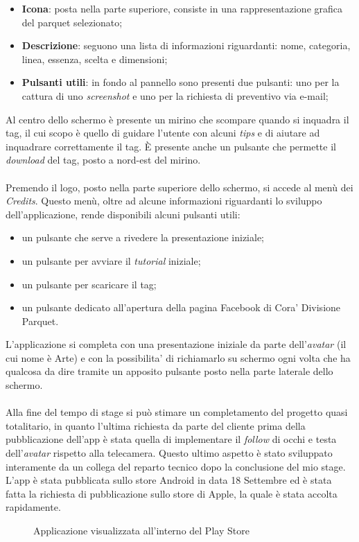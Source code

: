 \begin{itemize}
	\item \textbf{Icona}: posta nella parte superiore, consiste in una rappresentazione grafica del parquet selezionato;
	\item \textbf{Descrizione}: seguono una lista di informazioni riguardanti: nome, categoria, linea, essenza, scelta e dimensioni;
	\item \textbf{Pulsanti utili}: in fondo al pannello sono presenti due pulsanti: uno per la cattura di uno \textit{screenshot} e uno per la richiesta di preventivo via e-mail;
\end{itemize}
\noindent
Al centro dello schermo \`e presente un mirino che scompare quando si inquadra il tag, il cui scopo \`e quello di guidare l'utente con alcuni \textit{tips} e di aiutare ad inquadrare correttamente il tag. \`E presente anche un pulsante che permette il \textit{download} del tag, posto a nord-est del mirino.\\\\
\noindent
Premendo il logo, posto nella parte superiore dello schermo, si accede al men\`u dei \textit{Credits}. Questo men\`u, oltre ad alcune informazioni riguardanti lo sviluppo dell'applicazione, rende disponibili alcuni pulsanti utili:

\begin{itemize}
	\item un pulsante che serve a rivedere la presentazione iniziale;
	\item un pulsante per avviare il \textit{tutorial} iniziale;
	\item un pulsante per scaricare il tag;
	\item un pulsante dedicato all'apertura della pagina Facebook di Cora' Divisione Parquet.
\end{itemize}
\noindent
L'applicazione si completa con una presentazione iniziale da parte dell'\textit{avatar\gloss} (il cui nome \`e Arte) e con la possibilita' di richiamarlo su schermo ogni volta che ha qualcosa da dire tramite un apposito pulsante posto nella parte laterale dello schermo.\\\\

\noindent
Alla fine del tempo di stage si pu\`o stimare un completamento del progetto quasi totalitario, in quanto l'ultima richiesta da parte del cliente prima della pubblicazione dell'app \`e stata quella di implementare il \textit{follow} di occhi e testa dell'\textit{avatar\gloss} rispetto alla telecamera. Questo ultimo aspetto \`e stato sviluppato interamente da un collega del reparto tecnico dopo la conclusione del mio stage.\\
L'app \`e stata pubblicata sullo store Android in data 18 Settembre ed \`e stata fatta la richiesta di pubblicazione sullo store di Apple, la quale \`e stata accolta rapidamente.

	\begin{figure}[H]
		\centering
		\caption{Applicazione visualizzata all'interno del Play Store}
		\label{fig:store}
	\end{figure}